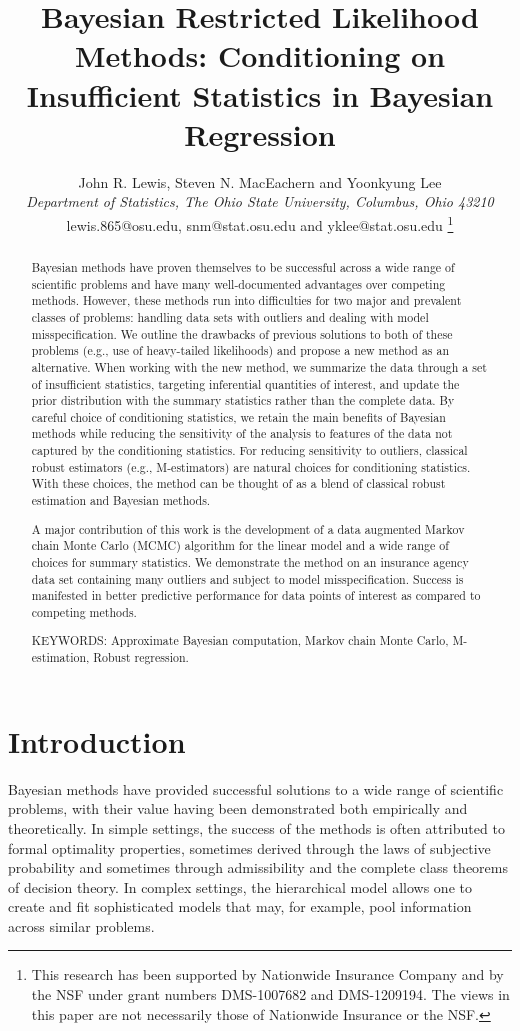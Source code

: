 \documentclass[12pt]{article}
\title{Bayesian Restricted Likelihood Methods: Conditioning on Insufficient Statistics in Bayesian Regression}
\author{John R. Lewis, Steven N. MacEachern and  Yoonkyung Lee \\
{\small \it Department of Statistics, The Ohio State University, Columbus, Ohio 43210}\\
{\small lewis.865@osu.edu, snm@stat.osu.edu and yklee@stat.osu.edu}
\thanks{This research has been supported by Nationwide Insurance Company and by the NSF under grant numbers DMS-1007682 and DMS-1209194.  The views in this paper are not necessarily those of Nationwide Insurance or the NSF.}}
\begin{document}
\date{}
\maketitle

\begin{abstract}
Bayesian methods have proven themselves to be successful across a wide
range of scientific problems and have many well-documented advantages
over competing methods. However, these methods run into difficulties
for two major and prevalent classes of problems: handling data sets
with outliers and dealing with model misspecification. We outline the
drawbacks of previous solutions to both of these problems (e.g., use of
heavy-tailed likelihoods) and propose a new method as an
alternative.  When working with the new method, we summarize
the data through a set of insufficient statistics,
targeting inferential quantities of interest, and update the prior
distribution with the summary statistics rather than the complete
data.  By careful choice of conditioning statistics, we
retain the main benefits of Bayesian methods while reducing the
sensitivity of the analysis to features of the data not captured by
the conditioning statistics. For reducing sensitivity to outliers,
classical robust estimators (e.g., M-estimators) are natural choices
for conditioning statistics. With these choices, the method can be thought of as a
blend of classical robust estimation and Bayesian methods. 

A major contribution of this work is the development of a data 
augmented Markov chain Monte Carlo (MCMC) algorithm
for the linear model and a wide range of choices for
summary statistics. We demonstrate the method on an
insurance agency data set containing many outliers and subject to model
misspecification. Success is manifested in better predictive
performance for data points of interest as compared to competing
methods.

\noindent KEYWORDS: Approximate Bayesian computation, Markov chain
Monte Carlo, M-estimation, Robust regression.


\end{abstract}

\section{Introduction}
Bayesian methods have provided successful solutions to a wide range of scientific problems, with their value
having been demonstrated both empirically and theoretically.  
In simple settings, the success of the methods is often attributed to formal optimality properties, sometimes derived
through the laws of subjective probability 
and sometimes through admissibility and the complete class
theorems of decision theory.  In complex settings, the hierarchical model allows one to create 
and fit sophisticated models that may, for example, pool information across similar problems.  
\end{document}
